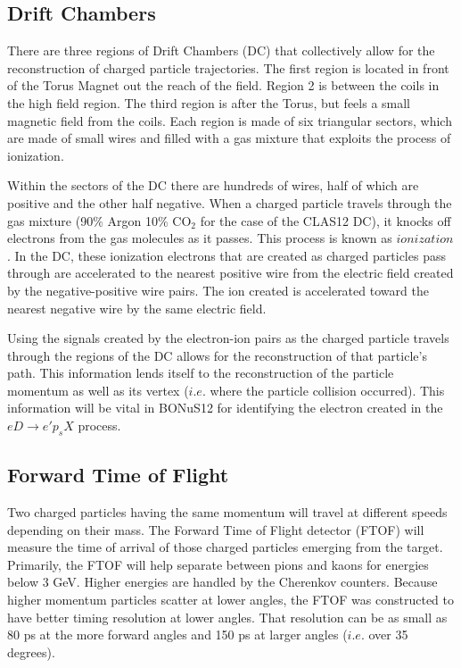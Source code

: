 \newpage
\subsection{Drift Chambers}
There are three regions of Drift Chambers (DC) that collectively allow for the reconstruction of charged particle trajectories. The first region is located in front of the Torus Magnet out the reach of the field. Region 2 is between the coils in the high field region. The third region is after the Torus, but feels a small magnetic field from the coils. Each region is made of six triangular sectors, which are made of small wires and filled with a gas mixture that exploits the process of ionization.

Within the sectors of the DC there are hundreds of wires, half of which are positive and the other half negative. When a charged particle travels through the gas mixture (90$\%$ Argon 10$\%$ CO$_2$ for the case of the CLAS12 DC), it knocks off electrons from the gas molecules as it passes. This process is known as $ionization$. In the DC, these ionization electrons that are created as charged particles pass through are accelerated to the nearest positive wire from the electric field created by the negative-positive wire pairs. The ion created is accelerated toward the nearest negative wire by the same electric field.

Using the signals created by the electron-ion pairs as the charged particle travels through the regions of the DC allows for the reconstruction of that particle's path. This information lends itself to the reconstruction of the particle momentum as well as its vertex ($i.e.$ where the particle collision occurred). This information will be vital in BONuS12 for identifying the electron created in the $eD \rightarrow e'p_sX$ process.

\subsection{Forward Time of Flight}
Two charged particles having the same momentum will travel at different speeds depending on their mass. The Forward Time of Flight detector (FTOF) will measure the time of arrival of those charged particles emerging from the target. Primarily, the FTOF will help separate between pions and kaons for energies below 3 GeV. Higher energies are handled by the Cherenkov counters. Because higher momentum particles scatter at lower angles, the FTOF was constructed to have better timing resolution at lower angles. That resolution can be as small as 80 ps at the more forward angles and 150 ps at larger angles ($i.e.$ over 35 degrees).

